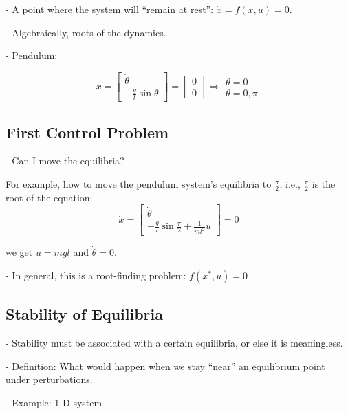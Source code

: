 - A point where the system will ``remain at rest'': $\dot{x} =f( x,u) =0$.

- Algebraically, roots of the dynamics.

- Pendulum:

\begin{equation}
    \dot{x} =\begin{bmatrix}
        \dot{\theta } \\
        -\frac{g}{l}\sin \theta
    \end{bmatrix} =\begin{bmatrix}
        0 \\
        0
    \end{bmatrix} \Rightarrow \begin{matrix}
        \dot{\theta } =0 \\
        \theta =0,\pi
    \end{matrix}
\end{equation}

\subsection{First Control Problem}

- Can I move the equilibria?

For example, how to move the pendulum system's equilibria to $\frac{\pi}{2}$, i.e., $\frac{\pi}{2}$ is the root of the equation:
\begin{equation}
    \dot{x} =\begin{bmatrix}
        \dot{\theta } \\
        -\frac{g}{l}\sin \frac{\pi}{2} +\frac{1}{ml^{2}} u
    \end{bmatrix} = 0
\end{equation}

we get $u=mgl$ and $\dot\theta=0$.

- In general, this is a root-finding problem: $f(x^*,u)=0$

\subsection{Stability of Equilibria}

- Stability must be associated with a certain equilibria, or else it is meaningless.

- Definition: What would happen when we stay ``near'' an equilibrium point under perturbations.

- Example: 1-D system

